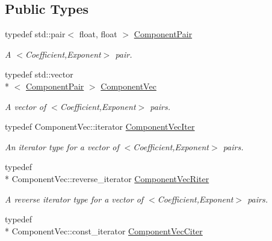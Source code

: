 \subsection*{Public Types}
\begin{DoxyCompactItemize}
\item 
\hypertarget{class_polynomial_data_aa51d94a0bfb9c8a6a22b6f42bc876b86}{typedef std\-::pair$<$ float, float $>$ \hyperlink{class_polynomial_data_aa51d94a0bfb9c8a6a22b6f42bc876b86}{Component\-Pair}}\label{class_polynomial_data_aa51d94a0bfb9c8a6a22b6f42bc876b86}

\begin{DoxyCompactList}\small\item\em A $<$Coefficient,Exponent$>$ pair. \end{DoxyCompactList}\item 
\hypertarget{class_polynomial_data_aa29043ac29b9eefb530b6671be625814}{typedef std\-::vector\\*
$<$ \hyperlink{class_polynomial_data_aa51d94a0bfb9c8a6a22b6f42bc876b86}{Component\-Pair} $>$ \hyperlink{class_polynomial_data_aa29043ac29b9eefb530b6671be625814}{Component\-Vec}}\label{class_polynomial_data_aa29043ac29b9eefb530b6671be625814}

\begin{DoxyCompactList}\small\item\em A vector of $<$Coefficient,Exponent$>$ pairs. \end{DoxyCompactList}\item 
\hypertarget{class_polynomial_data_a5ae869760aeed6d622bd0229b8eb8d76}{typedef Component\-Vec\-::iterator \hyperlink{class_polynomial_data_a5ae869760aeed6d622bd0229b8eb8d76}{Component\-Vec\-Iter}}\label{class_polynomial_data_a5ae869760aeed6d622bd0229b8eb8d76}

\begin{DoxyCompactList}\small\item\em An iterator type for a vector of $<$Coefficient,Exponent$>$ pairs. \end{DoxyCompactList}\item 
\hypertarget{class_polynomial_data_a82be1374bb854aca018846d21094125e}{typedef \\*
Component\-Vec\-::reverse\-\_\-iterator \hyperlink{class_polynomial_data_a82be1374bb854aca018846d21094125e}{Component\-Vec\-Riter}}\label{class_polynomial_data_a82be1374bb854aca018846d21094125e}

\begin{DoxyCompactList}\small\item\em A reverse iterator type for a vector of $<$Coefficient,Exponent$>$ pairs. \end{DoxyCompactList}\item 
\hypertarget{class_polynomial_data_a7f77c4a643aa4b9fde19201969f8d787}{typedef \\*
Component\-Vec\-::const\-\_\-iterator \hyperlink{class_polynomial_data_a7f77c4a643aa4b9fde19201969f8d787}{Component\-Vec\-Citer}}\label{class_polynomial_data_a7f77c4a643aa4b9fde19201969f8d787}


\end{DoxyCompactItemize}
